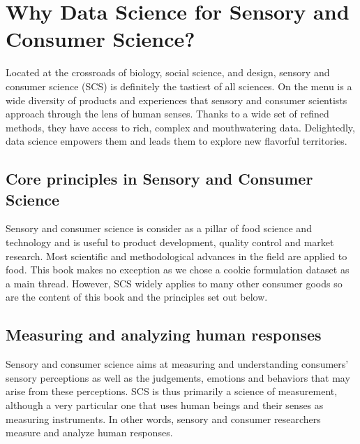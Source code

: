 \documentclass[
]{book}
\begin{document}
\hypertarget{why-data-science-for-sensory-and-consumer-science}{%
\section*{Why Data Science for Sensory and Consumer Science?}\label{why-data-science-for-sensory-and-consumer-science}}

Located at the crossroads of biology, social science, and design, sensory and consumer science (SCS) is definitely the tastiest of all sciences. On the menu is a wide diversity of products and experiences that sensory and consumer scientists approach through the lens of human senses. Thanks to a wide set of refined methods, they have access to rich, complex and mouthwatering data. Delightedly, data science empowers them and leads them to explore new flavorful territories.

\hypertarget{core-principles-in-sensory-and-consumer-science}{%
\subsection*{Core principles in Sensory and Consumer Science}\label{core-principles-in-sensory-and-consumer-science}}

Sensory and consumer science is consider as a pillar of food science and technology and is useful to product development, quality control and market research. Most scientific and methodological advances in the field are applied to food. This book makes no exception as we chose a cookie formulation dataset as a main thread. However, SCS widely applies to many other consumer goods so are the content of this book and the principles set out below.

\hypertarget{measuring-and-analyzing-human-responses}{%
\subsection*{Measuring and analyzing human responses}\label{measuring-and-analyzing-human-responses}}

Sensory and consumer science aims at measuring and understanding consumers' sensory perceptions as well as the judgements, emotions and behaviors that may arise from these perceptions. SCS is thus primarily a science of measurement, although a very particular one that uses human beings and their senses as measuring instruments. In other words, sensory and consumer researchers measure and analyze human responses.
\end{document}
